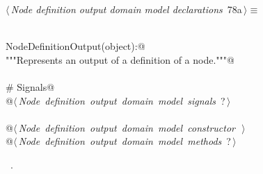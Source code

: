 \documentclass[
    a4paper,      %
    10pt,         %
    openright,    %
    notitlepage,  %
    parskip=half, %
]{scrreprt}       %
\theoremstyle{definition}                    %
\begin{document}
\begin{flushleft} \small
\begin{minipage}{\linewidth}\label{scrap128}\raggedright\small
{} $\langle\,${\itshape Node definition output domain model declarations}\nobreak\ {\footnotesize {78a}}$\,\rangle\equiv$
\vspace{-1exm}
\begin{list}{}{} \item
\mbox{}\lstinline@@\\
\mbox{}\lstinline@class NodeDefinitionOutput(object):@\\
\mbox{}\lstinline@    """Represents an output of a definition of a node."""@\\
\mbox{}\lstinline@@\\
\mbox{}\lstinline@    # Signals@\\
\mbox{}\lstinline@    @\hbox{$\langle\,${\itshape Node definition output domain model signals}\nobreak\ {\footnotesize ?}$\,\rangle$}\lstinline@@\\
\mbox{}\lstinline@@\\
\mbox{}\lstinline@    @\hbox{$\langle\,${\itshape Node definition output domain model constructor}\nobreak\ {\footnotesize {}}$\,\rangle$}\lstinline@@\\
\mbox{}\lstinline@    @\hbox{$\langle\,${\itshape Node definition output domain model methods}\nobreak\ {\footnotesize ?}$\,\rangle$}\lstinline@@{\NWsep}
\end{list}
\vspace{-1.5ex}
\footnotesize
\begin{list}{}{\setlength{\itemsep}{-\parsep}\setlength{\itemindent}{-\leftmargin}}
\item \NWtxtMacroRefIn\ .

\item{}
\end{list}
\end{minipage}\vspace{4ex}
\end{flushleft}
\end{document}
